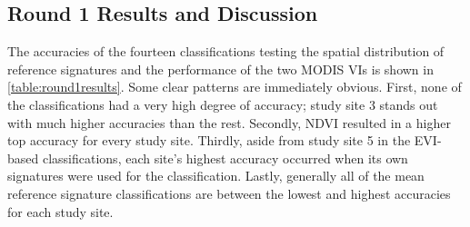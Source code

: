 \subsection*{Round 1 Results and Discussion}
\label{appendix:testing:r1:results}

The accuracies of the fourteen classifications testing the spatial distribution of reference signatures and the performance of the two MODIS VIs is shown in \autoref{table:round1results}. Some clear patterns are immediately obvious. First, none of the classifications had a very high degree of accuracy; study site 3 stands out with much higher accuracies than the rest. Secondly, NDVI resulted in a higher top accuracy for every study site. Thirdly, aside from study site 5 in the EVI-based classifications, each site's highest accuracy occurred when its own signatures were used for the classification. Lastly, generally all of the mean reference signature classifications are between the lowest and highest accuracies for each study site.

